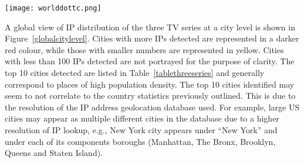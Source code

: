\documentclass[conference]{IEEEtran}
\begin{document}
\begin{figure*}
\centering
\begin{minipage}[b]{0.8\textwidth}

\texttt{[image: worlddottc.png]}

\caption{Global Map of the IP Distribution at City Level}
\label{globalcitylevel}
\end{minipage}\qquad
\end{figure*}

A global view of IP distribution of the three TV series at a city level is shown in Figure~\ref{globalcitylevel}. Cities with more IPs detected are represented in a darker red colour, while those with smaller numbers are represented in yellow. Cities with less than 100 IPs detected are not portrayed for the purpose of clarity. 
The top 10 cities detected are listed in Table~\ref{tablethreeseries} and generally correspond to places of high population density. The top 10 cities identified may seem to not correlate to the country statistics previously outlined. This is due to the resolution of the IP address geolocation database used. For example, large US cities may appear as multiple different cities in the database due to a higher resolution of IP lookup, e.g., New York city appears under ``New York'' and under each of its components boroughs (Manhattan, The Bronx, Brooklyn, Queens and Staten Island).

\begin{table}[!h]
\begin{footnotesize}
\renewcommand{\arraystretch}{1.0}
\caption{Top 10 Cities for the Three TV Shows}
\label{tablethreeseries}
\end{footnotesize}
\end{table}
\end{document}
